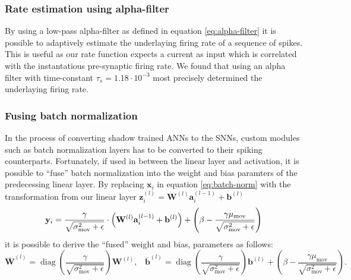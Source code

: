 \documentclass[a4paper,11pt]{article} %
\begin{document}
\subsubsection{Rate estimation using alpha-filter}
By using a low-pass alpha-filter as defined in equation \ref{eq:alpha-filter} it is possible to adaptively estimate the underlaying firing rate of a sequence of spikes. This is useful as our rate function expects a current as input which is correlated with the instantatious pre-synaptic firing rate. We found that using an alpha filter with time-constant $\tau_s = 1.18 \cdot 10^{-3}$ most precisely determined the underlaying firing rate. 

\subsubsection{Fusing batch normalization}
In the process of converting shadow trained ANNs to the SNNs, custom modules such as batch normalization layers has to be converted to their spiking counterparts. Fortunately, if used in between the linear layer and activation, it is possible to ``fuse'' batch normalization into the weight and bias paramters of the predecessing linear layer. By replacing $\mathbf{x}_i$ in equation \ref{eq:batch-norm} with the transformation from our linear layer $\mathbf{z}_i^{(l)} = \mathbf{W}^{(l)} \mathbf{a}^{(l-1)}_i  + \mathbf{b}^{(l)}$ 
\begin{equation}
    \mathbf{y}_i = \frac{\gamma}{\sqrt{\sigma^{2}_\text{mov} +\epsilon}} \cdot \left( 
      \mathbf{W}^{(l)} \mathbf{a}^{(l-1)}_i  + \mathbf{b}^{(l)}
    \right) + \left(\beta - \frac{\gamma \mu_\text{mov}}{\sqrt{\sigma^{2}_\text{mov}+\epsilon}}\right) \\
\end{equation}
it is possible to derive the ``fused'' weight and bias, parameters as follows:
\begin{equation}
    \overline{\mathbf{W}}^{(l)} = \operatorname{diag} \left( \frac{\gamma}{\sqrt{\sigma^{2}_\text{mov} +\epsilon}} \right) \mathbf{W}^{(l)}, \hspace{10pt} \overline{\mathbf{b}}^{(l)} =  \operatorname{diag} \left( \frac{\gamma}{\sqrt{\sigma^{2}_\text{mov} +\epsilon}} \right) \mathbf{b}^{(l)} + \left(\beta - \frac{\gamma \mu_\text{mov}}{\sqrt{\sigma^{2}_\text{mov}+\epsilon}}\right).
\end{equation}
\end{document}
